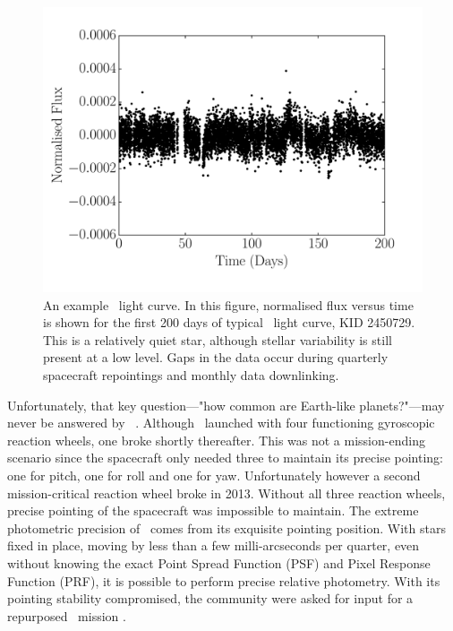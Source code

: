 \begin{figure}[p]
\begin{center}
\includegraphics[width=6in, clip=true]{figures/demo_kepler_lightcurve.pdf}
\caption[An example \kepler\ light curve.]
{An example \kepler\ light curve.
In this figure, normalised flux versus time is shown for the first 200 days
of typical \kepler\ light curve, KID 2450729.
This is a relatively quiet star, although stellar variability is still present
at a low level.
Gaps in the data occur during quarterly spacecraft repointings and monthly
data downlinking.}
\label{fig:demo_kepler_lightcurve}
\end{center}
\end{figure}

Unfortunately, that key question---"how common are Earth-like planets?"---may
never be answered by \kepler\ \citep[or at least not very precisely. Several
inferences have been performed by extrapolation, \eg][]{Petigura2013,
Foreman-Mackey2014, Burke2015}.
Although \kepler\ launched with four functioning gyroscopic reaction wheels,
one broke shortly thereafter.
This was not a mission-ending scenario since the spacecraft only needed three
to maintain its precise pointing: one for pitch, one for roll and one for yaw.
Unfortunately however a second mission-critical reaction wheel
broke in 2013.
Without all three reaction wheels, precise pointing of the spacecraft was
impossible to maintain.
The extreme photometric precision of \kepler\ comes from its exquisite
pointing position.
With stars fixed in place, moving by less than a few milli-arcseconds per
quarter, even without knowing the exact Point Spread Function (PSF) and Pixel
Response Function (PRF), it is possible to perform precise relative
photometry.
With its pointing stability compromised, the community were asked for input
for a repurposed \kepler\ mission \citep[\eg][]{Hogg2013, Aigrain2015}.

